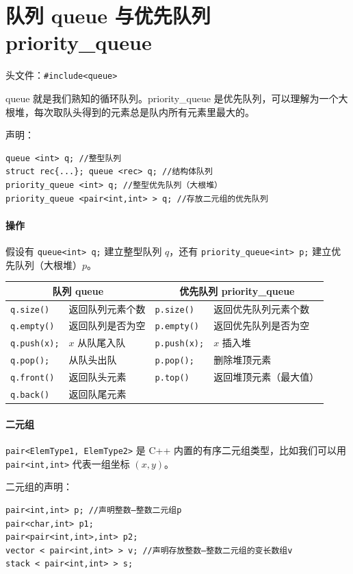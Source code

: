 \documentclass[UTF8]{ctexart}
\begin{document}
\section{队列 queue 与优先队列 priority\_queue}
头文件：\verb!#include<queue>!

queue 就是我们熟知的循环队列。priority\_queue 是优先队列，可以理解为一个大根堆，每次取队头得到的元素总是队内所有元素里最大的。

声明：
\begin{lstlisting}[numbers=none]
queue <int> q; //整型队列
struct rec{...}; queue <rec> q; //结构体队列
priority_queue <int> q; //整型优先队列（大根堆）
priority_queue <pair<int,int> > q; //存放二元组的优先队列
\end{lstlisting}

\paragraph{操作} 假设有 \verb!queue<int> q;! 建立整型队列 $q$，还有 \verb!priority_queue<int> p;! 建立优先队列（大根堆）$p$。
\begin{table}[H]
  \centering
  \begin{tabular}{llll}
  \toprule
  \multicolumn{2}{c}{队列 queue} & \multicolumn{2}{c}{优先队列 priority\_queue} \\
  \midrule
  \verb!q.size()! & 返回队列元素个数 & \verb!p.size()! & 返回优先队列元素个数 \\
  \verb!q.empty()! & 返回队列是否为空 & \verb!p.empty()! & 返回优先队列是否为空 \\
  \verb!q.push(x);! & $x$ 从队尾入队 & \verb!p.push(x);! & $x$ 插入堆 \\
  \verb!q.pop();! & 从队头出队 & \verb!p.pop();! & 删除堆顶元素 \\
  \verb!q.front()! & 返回队头元素 & \verb!p.top()! & 返回堆顶元素（最大值） \\
  \verb!q.back()! & 返回队尾元素 & & \\
  \bottomrule
  \end{tabular}
\end{table}

\paragraph{二元组}
\verb!pair<ElemType1, ElemType2>! 是 C++ 内置的有序二元组类型，比如我们可以用 \verb!pair<int,int>! 代表一组坐标 $(x,y)$。\textcolor{cyan}{}

二元组的声明：
\begin{lstlisting}[numbers=none]
pair<int,int> p; //声明整数—整数二元组p
pair<char,int> p1; 
pair<pair<int,int>,int> p2;
vector < pair<int,int> > v; //声明存放整数—整数二元组的变长数组v
stack < pair<int,int> > s; 
\end{lstlisting}
\end{document}
